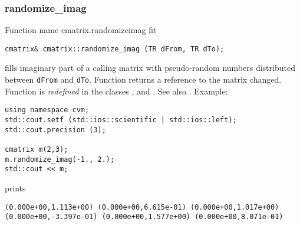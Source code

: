 \subsubsection{randomize\_imag}
Function%
\pdfdest name {cmatrix.randomizeimag} fit
\begin{verbatim}
cmatrix& cmatrix::randomize_imag (TR dFrom, TR dTo);
\end{verbatim}
fills  imaginary part of a calling matrix with 
pseudo-random numbers distributed between
\verb"dFrom" and \verb"dTo".
Function
returns a reference to the matrix changed.
Function is \emph{redefined} in the classes
,  and
.
See also
.
Example:
\begin{Verbatim}
using namespace cvm;
std::cout.setf (std::ios::scientific | std::ios::left); 
std::cout.precision (3);

cmatrix m(2,3);
m.randomize_imag(-1., 2.);
std::cout << m;
\end{Verbatim}
prints
\begin{Verbatim}
(0.000e+00,1.113e+00) (0.000e+00,6.615e-01) (0.000e+00,1.017e+00)
(0.000e+00,-3.397e-01) (0.000e+00,1.577e+00) (0.000e+00,8.071e-01)
\end{Verbatim}
\newpage

